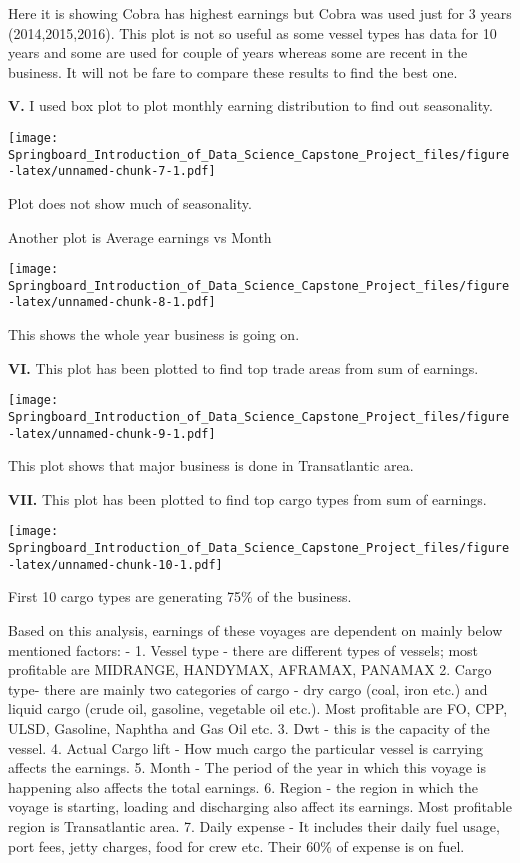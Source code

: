 \documentclass[]{article}
\begin{document}
Here it is showing Cobra has highest earnings but Cobra was used just
for 3 years (2014,2015,2016). This plot is not so useful as some vessel
types has data for 10 years and some are used for couple of years
whereas some are recent in the business. It will not be fare to compare
these results to find the best one.

\textbf{V.} I used box plot to plot monthly earning distribution to find
out seasonality.

\texttt{[image: Springboard\_Introduction\_of\_Data\_Science\_Capstone\_Project\_files/figure-latex/unnamed-chunk-7-1.pdf]}

Plot does not show much of seasonality.

Another plot is Average earnings vs Month

\texttt{[image: Springboard\_Introduction\_of\_Data\_Science\_Capstone\_Project\_files/figure-latex/unnamed-chunk-8-1.pdf]}

This shows the whole year business is going on.

\textbf{VI.} This plot has been plotted to find top trade areas from sum
of earnings.

\texttt{[image: Springboard\_Introduction\_of\_Data\_Science\_Capstone\_Project\_files/figure-latex/unnamed-chunk-9-1.pdf]}

This plot shows that major business is done in Transatlantic area.

\textbf{VII.} This plot has been plotted to find top cargo types from
sum of earnings.

\texttt{[image: Springboard\_Introduction\_of\_Data\_Science\_Capstone\_Project\_files/figure-latex/unnamed-chunk-10-1.pdf]}

First 10 cargo types are generating 75\% of the business.

Based on this analysis, earnings of these voyages are dependent on
mainly below mentioned factors: - 1. Vessel type - there are different
types of vessels; most profitable are MIDRANGE, HANDYMAX, AFRAMAX,
PANAMAX 2. Cargo type- there are mainly two categories of cargo - dry
cargo (coal, iron etc.) and liquid cargo (crude oil, gasoline, vegetable
oil etc.). Most profitable are FO, CPP, ULSD, Gasoline, Naphtha and Gas
Oil etc. 3. Dwt - this is the capacity of the vessel. 4. Actual Cargo
lift - How much cargo the particular vessel is carrying affects the
earnings. 5. Month - The period of the year in which this voyage is
happening also affects the total earnings. 6. Region - the region in
which the voyage is starting, loading and discharging also affect its
earnings. Most profitable region is Transatlantic area. 7. Daily expense
- It includes their daily fuel usage, port fees, jetty charges, food for
crew etc. Their 60\% of expense is on fuel.
\end{document}
